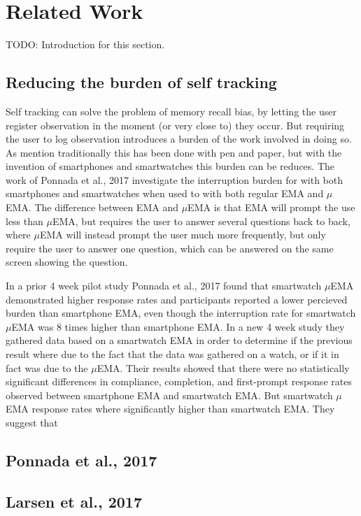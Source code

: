 \chapter{Related Work}

TODO: Introduction for this section. 

\section{Reducing the burden of self tracking}
Self tracking can solve the problem of memory recall bias, by letting the user register observation in the moment (or very close to) they occur. But requiring the user to log observation introduces a burden of the work involved in doing so. As mention traditionally this has been done with pen and paper, but with the invention of smartphones and smartwatches this burden can be reduces. The work of Ponnada et al., 2017 \cite{compare} investigate the interruption burden for with both smartphones and smartwatches when used to with both regular EMA and $\mu$EMA. The difference between EMA and $\mu$EMA is that EMA will prompt the use less than $\mu$EMA, but requires the user to answer several questions back to back, where $\mu$EMA will instead prompt the user much more frequently, but only require the user to answer one question, which can be answered on the same screen showing the question. 


In a prior 4 week pilot study Ponnada et al., 2017 found that smartwatch $\mu$EMA demonstrated higher response rates and participants reported a lower percieved burden than smartphone EMA, even though the interruption rate for smartwatch $\mu$EMA was 8 times higher than smartphone EMA. In a new 4 week study they gathered data based on a smartwatch EMA in order to determine if the previous result where due to the fact that the data was gathered on a watch, or if it in fact was due to the $\mu$EMA. Their results showed that there were no statistically significant differences in compliance, completion, and first-prompt response rates observed between smartphone EMA and smartwatch EMA. But smartwatch $\mu$EMA response rates where significantly higher than smartwatch EMA. They suggest that 

\section{Ponnada et al., 2017}

\cite{compare}


\section{Larsen et al., 2017}
\cite{eg}

